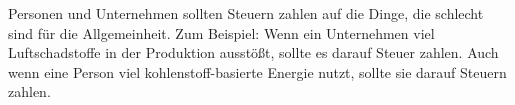Personen und Unternehmen sollten Steuern zahlen auf die Dinge, die schlecht sind für die Allgemeinheit.
Zum Beispiel: Wenn ein Unternehmen viel Luftschadstoffe in der Produktion ausstößt, sollte es darauf Steuer zahlen.
Auch wenn eine Person viel kohlenstoff-basierte Energie nutzt, sollte sie darauf Steuern zahlen.